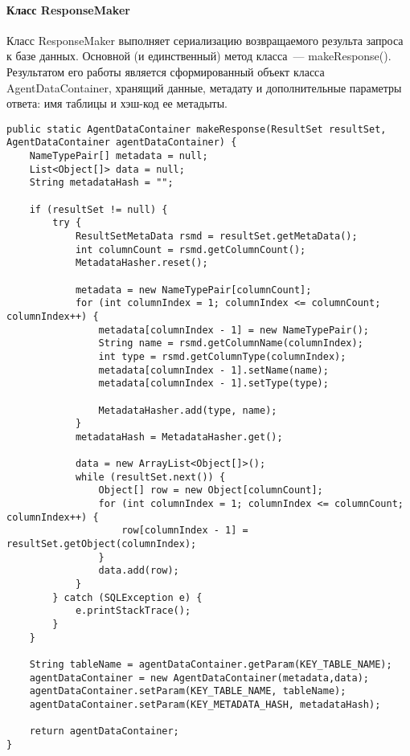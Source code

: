 \paragraph{Класс ResponseMaker}
Класс ResponseMaker выполняет сериализацию возвращаемого результа запроса к базе данных. Основной (и единственный) метод класса~--- makeResponse(). Результатом его работы является сформированный объект класса AgentDataContainer, хранящий данные, метадату и дополнительные параметры ответа: имя таблицы и хэш-код ее метадыты.
\begin{verbatim}
public static AgentDataContainer makeResponse(ResultSet resultSet, AgentDataContainer agentDataContainer) {
    NameTypePair[] metadata = null;
    List<Object[]> data = null;
    String metadataHash = "";

    if (resultSet != null) {
        try {
            ResultSetMetaData rsmd = resultSet.getMetaData();
            int columnCount = rsmd.getColumnCount();
            MetadataHasher.reset();

            metadata = new NameTypePair[columnCount];
            for (int columnIndex = 1; columnIndex <= columnCount; columnIndex++) {
                metadata[columnIndex - 1] = new NameTypePair();
                String name = rsmd.getColumnName(columnIndex);
                int type = rsmd.getColumnType(columnIndex);
                metadata[columnIndex - 1].setName(name);
                metadata[columnIndex - 1].setType(type);

                MetadataHasher.add(type, name);
            }
            metadataHash = MetadataHasher.get();

            data = new ArrayList<Object[]>();
            while (resultSet.next()) {
                Object[] row = new Object[columnCount];
                for (int columnIndex = 1; columnIndex <= columnCount; columnIndex++) {
                    row[columnIndex - 1] = resultSet.getObject(columnIndex);
                }
                data.add(row);
            }
        } catch (SQLException e) {
            e.printStackTrace();
        }
    }

    String tableName = agentDataContainer.getParam(KEY_TABLE_NAME);
    agentDataContainer = new AgentDataContainer(metadata,data);
    agentDataContainer.setParam(KEY_TABLE_NAME, tableName);
    agentDataContainer.setParam(KEY_METADATA_HASH, metadataHash);

    return agentDataContainer;
}
\end{verbatim}

